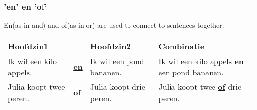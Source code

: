\documentclass[a4paper,14pt]{extarticle}
\newcommand{\emp}[1]{\underline{\textbf{#1}}}
\begin{document}
\subsubsection{'en' en 'of'}
En(as in and) and of(as in or) are used to connect to sentences together.\\
\begin{tabularx}{\textwidth}{ p{} p{} p{} p{} }
 \hline
 Hoofdzin1 &  & Hoofdzin2 & Combinatie\\
 \hline
 Ik wil een kilo appels. & \emp{en} & Ik wil een pond bananen. & Ik wil een kilo appels \emp{en} een pond bananen. \\
 Julia koopt twee peren. & \emp{of} & Julia koopt drie peren. & Julia koopt twee \emp{of} drie peren. \\
\end{tabularx}
\end{document}
